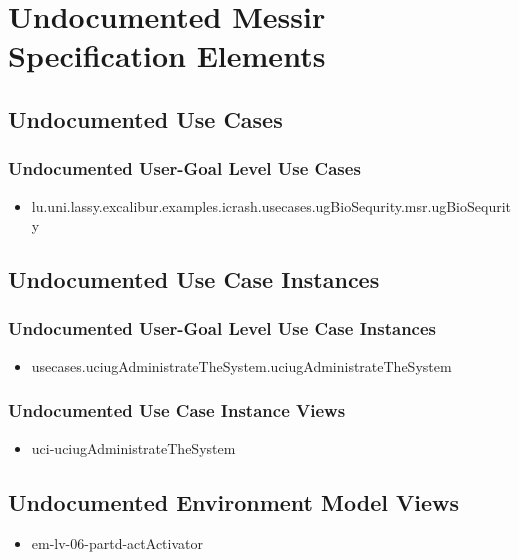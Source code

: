 	
\chapter{Undocumented Messir Specification Elements}


\section[Undocumented Use Cases]{Undocumented Use Cases}


\subsection[Undocumented Use Cases - User-Goal Level]{Undocumented User-Goal Level Use Cases}
\begin{itemize}
\item lu.uni.lassy.excalibur.examples.icrash.usecases.ugBioSequrity.msr.ugBioSequrity 
\end{itemize}






\section[Undocumented Use Case Instances]{Undocumented Use Case Instances}


\subsection[Undocumented Use Case Instances - User-Goal Level]{Undocumented User-Goal Level Use Case Instances}
\begin{itemize}
\item usecases.uciugAdministrateTheSystem.uciugAdministrateTheSystem 
\end{itemize}


\subsection[Undocumented Use Case Instance Views]{Undocumented Use Case Instance Views}
\begin{itemize}
\item uci-uciugAdministrateTheSystem 
\end{itemize}




\section[Undocumented Environment Model Views]{Undocumented Environment Model Views}
\begin{itemize}
\item em-lv-06-partd-actActivator 
\end{itemize}












